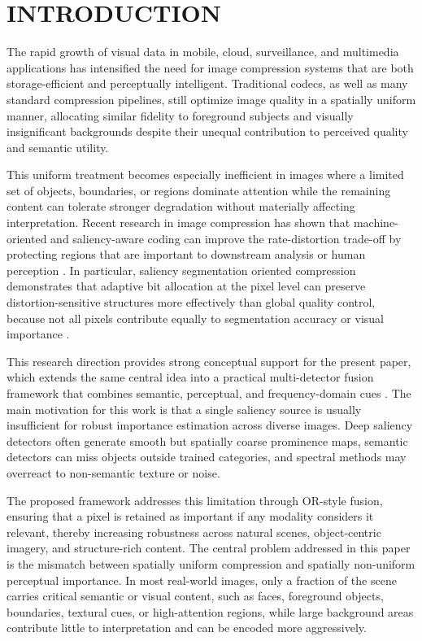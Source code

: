 \documentclass[11pt,                                                             
 superscriptaddress,twoside,
 amsmath,amssymb,
 aps, physrev
]{revtex4-2}
\begin{document}
\section{INTRODUCTION}
The rapid growth of visual data in mobile, cloud, surveillance, and multimedia applications has intensified the need for image compression systems that are both storage-efficient and perceptually intelligent. Traditional codecs, as well as many standard compression pipelines, still optimize image quality in a spatially uniform manner, allocating similar fidelity to foreground subjects and visually insignificant backgrounds despite their unequal contribution to perceived quality and semantic utility.

This uniform treatment becomes especially inefficient in images where a limited set of objects, boundaries, or regions dominate attention while the remaining content can tolerate stronger degradation without materially affecting interpretation. Recent research in image compression has shown that machine-oriented and saliency-aware coding can improve the rate-distortion trade-off by protecting regions that are important to downstream analysis or human perception \cite{li2024video}. In particular, saliency segmentation oriented compression demonstrates that adaptive bit allocation at the pixel level can preserve distortion-sensitive structures more effectively than global quality control, because not all pixels contribute equally to segmentation accuracy or visual importance \cite{li2024ieee}.

This research direction provides strong conceptual support for the present paper, which extends the same central idea into a practical multi-detector fusion framework that combines semantic, perceptual, and frequency-domain cues \cite{hou2007ieee, li2023arxiv}. The main motivation for this work is that a single saliency source is usually insufficient for robust importance estimation across diverse images. Deep saliency detectors often generate smooth but spatially coarse prominence maps, semantic detectors can miss objects outside trained categories, and spectral methods may overreact to non-semantic texture or noise.

The proposed framework addresses this limitation through OR-style fusion, ensuring that a pixel is retained as important if any modality considers it relevant, thereby increasing robustness across natural scenes, object-centric imagery, and structure-rich content. The central problem addressed in this paper is the mismatch between spatially uniform compression and spatially non-uniform perceptual importance. In most real-world images, only a fraction of the scene carries critical semantic or visual content, such as faces, foreground objects, boundaries, textural cues, or high-attention regions, while large background areas contribute little to interpretation and can be encoded more aggressively.
\end{document}
